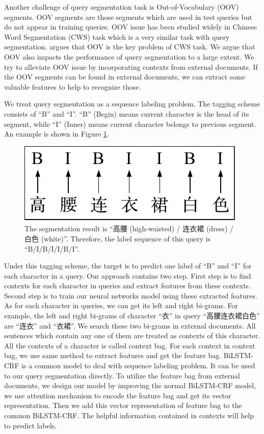 Another challenge of query segmentation task is Out-of-Vocabulary (OOV) segments.
OOV segments are those segments which are used in test queries but do not appear in training queries.
OOV issue has been studied widely in Chinese Word Segmentation (CWS) task
\cite{Xue2003Chinese,Jin2005A,Zhao2006An,huang2007chinese,Zheng2013Deep} which is a very similar task with query segmentation.
\cite{huang2007chinese} argues that OOV is the key problem of CWS task.
We argue that OOV also impacts the performance of query segmentation to a large extent.
We try to alleviate OOV issue by incorporating contexts from external documents.
If the OOV segments can be found in external documents, we can extract some valuable features to help to recognize those.

We treat query segmentation as a sequence labeling problem.
The tagging scheme consists of ``B'' and ``I''.
``B'' (Begin) means current character is the head of its segment,
while ``I'' (Inner) means current character belongs to previous segment.
An example is shown in Figure \ref{fig:sq}.
\begin{figure}[th]
	\centering
	\includegraphics[width=0.45\columnwidth]{figures/introduction.pdf}
	\caption{The segmentation result is ``高腰 (high-waisted) / 连衣裙 (dress) / 白色 (white)''. Therefore, the label sequence of this query is ``B/I/B/I/I/B/I''.}
	\label{fig:sq}
\end{figure}
Under this tagging scheme,
the target is to predict one label of ``B'' and ``I'' for each character in a query.
Our approach contains two step.
First step is to find contexts for each character in queries and extract features from these contexts.
Second step is to train our neural networks model using these extracted features.
As for each character in queries, we can get its left and right bi-grams. For example, the left and right bi-grams of character ``衣'' in query ``高腰连衣裙白色'' are ``连衣'' and ``衣裙''. 
We search these two bi-grams in external documents.
All sentences which contain any one of them are treated as contexts of this character.
All the contexts of a character is called context bag.
For each context in context bag, we use same method to extract features and get the feature bag.
BiLSTM-CRF \cite{Huang2015Bidirectional,Ma2016End} is a common model to deal with sequence labeling problem.
It can be used to our query segmentation directly.
To utilize the feature bag from external documents,
we design our model by improving the normal BiLSTM-CRF model,
we use attention mechanism \cite{bahdanau2014neural} to encode the feature bag and get its vector representation.
Then we add this vector representation of feature bag to the common BiLSTM-CRF.
The helpful information contained in contexts will help to predict labels.

